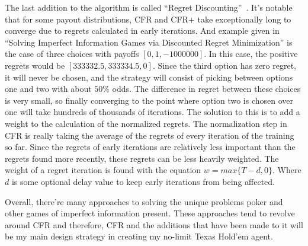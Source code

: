 \documentclass[12pt, letterpaper]{article}
\begin{document}
The last addition to the algorithm is called “Regret Discounting”~\cite{discounted-regret}. It’s notable that for some payout distributions, CFR and CFR+
take exceptionally long to converge due to regrets calculated in early iterations. And example given in “Solving
Imperfect Information Games via Discounted Regret Minimization” is the case of three choices
with payoffs $[0, 1, -1000000]$. In this case, the positive regrets would be
$[333332.5, 333334.5, 0]$. Since the third option has zero regret, it will never be chosen, and
the strategy will consist of picking between options one and two with about $50\%$ odds. The difference
in regret between these choices is very small, so finally converging to the point where
option two is chosen over one will take hundreds of thousands of iterations. The solution to this is to add a weight to the calculation of the
normalized regrets. The normalization step in CFR is really taking the average of the regrets of
every iteration of the training so far. Since the regrets of early iterations are relatively less
important than the regrets found more recently, these regrets can be less heavily weighted. The
weight of a regret iteration is found with the equation $w = max\{T-d, 0\}$. Where $d$ is some
optional delay value to keep early iterations from being affected.

Overall, there're many approaches to solving the unique problems poker and other games
of imperfect information present. These approaches tend to revolve around CFR and therefore,
CFR and the additions that have been made to it will be my main design strategy in creating my
no-limit Texas Hold’em agent.



\end{document}
